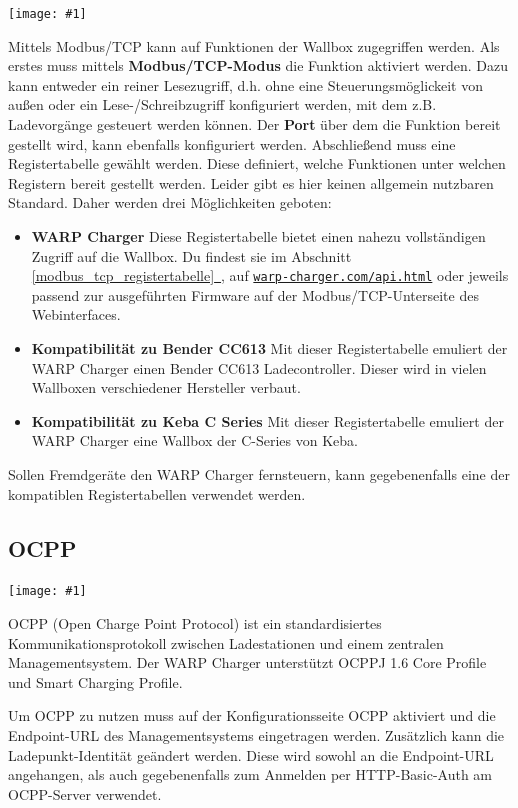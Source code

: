 \documentclass[a4paper,10pt]{article}
\newcommand{\gfx}[1]{\texttt{[image: \#1]}}
\newcommand*{\fullref}[1]{\hyperref[{#1}]{\ref*{#1}~\nameref*{#1}}}
\newcommand\rurl[2]{%
  \href{#1}{\nolinkurl{#2}}%
}
\begin{document}
\begin{multicols*}{2}
	\gfx{./img_warp2/resized/web_modbus_tcp}

	Mittels Modbus/TCP kann auf Funktionen der Wallbox zugegriffen werden.
	Als erstes muss mittels \textbf{Modbus/TCP-Modus} die Funktion aktiviert
	werden. Dazu kann entweder ein reiner Lesezugriff, d.h. ohne eine
	Steuerungsmöglickeit von außen oder ein Lese-/Schreibzugriff
	konfiguriert werden, mit dem z.B. Ladevorgänge gesteuert werden können.
	Der \textbf{Port} über dem die Funktion bereit gestellt
	wird, kann ebenfalls konfiguriert werden. Abschließend muss eine
	Registertabelle gewählt werden. Diese definiert, welche Funktionen unter
	welchen Registern bereit gestellt werden. Leider gibt es hier keinen
	allgemein nutzbaren Standard. Daher werden drei Möglichkeiten geboten:

	\begin{itemize}
		\item \textbf{WARP Charger} Diese Registertabelle bietet einen nahezu vollständigen Zugriff auf die Wallbox.
				Du findest sie im Abschnitt \fullref{modbus_tcp_registertabelle}, auf \rurl{https://warp-charger.com/api.html}{warp-charger.com/api.html} oder
				jeweils passend zur ausgeführten Firmware auf der Modbus/TCP-Unterseite des Webinterfaces.
		\item \textbf{Kompatibilität zu Bender CC613} Mit dieser Registertabelle emuliert der WARP Charger einen Bender CC613 Ladecontroller. Dieser wird in vielen Wallboxen verschiedener Hersteller verbaut.
		\item \textbf{Kompatibilität zu Keba C Series} Mit dieser Registertabelle emuliert der WARP Charger eine Wallbox der C-Series von Keba.
	\end{itemize}

	Sollen Fremdgeräte den WARP Charger fernsteuern, kann gegebenenfalls eine der
	kompatiblen Registertabellen verwendet werden.

	\subsection{OCPP}

	\gfx{./img_warp2/resized/web_ocpp}

	OCPP (Open Charge Point Protocol) ist ein standardisiertes Kommunikationsprotokoll zwischen
	Ladestationen und einem zentralen Managementsystem. Der WARP Charger
	unterstützt OCPPJ 1.6 Core Profile und Smart Charging Profile.

	Um OCPP zu nutzen muss auf der Konfigurationsseite OCPP aktiviert und die
	Endpoint-URL des Managementsystems eingetragen werden. Zusätzlich kann die Ladepunkt-Identität
	geändert werden. Diese wird sowohl an die Endpoint-URL angehangen, als auch gegebenenfalls zum
	Anmelden per HTTP-Basic-Auth am OCPP-Server verwendet.


\end{multicols*}
\end{document}
